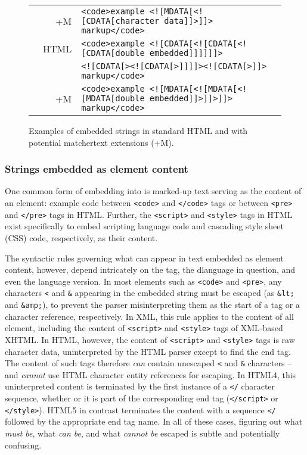 \begin{figure*}
\begin{center}
\begin{footnotesize}
\begin{tabular}{lrl}
& +M	& \verb|<code>example <![MDATA[<![CDATA[character data]]>]]> markup</code>| \\
& HTML	& \verb|<code>example <![CDATA[<![CDATA[<![CDATA[double embedded]]]]]]>| \\
&	& \verb|<![CDATA[><![CDATA[>]]]]><![CDATA[>]]> markup</code>| \\
& +M	& \verb|<code>example <![MDATA[<![MDATA[<![MDATA[double embedded]]>]]>]]> markup</code>| \\
\end{tabular}
\end{footnotesize}
\end{center}
\label{fig:ml-emb}
\caption{Examples of embedded strings in standard HTML
	and with potential matchertext extensions (+M).}
\end{figure*}


\subsubsection{Strings embedded as element content}

One common form of embedding into \ml 
is marked-up text serving as the content of an element:
\eg example code between \verb|<code>| and \verb|</code>| tags
or between \verb|<pre>| and \verb|</pre>| tags in HTML.
Further, the \verb|<script>| and \verb|<style>| tags in HTML
exist specifically to embed scripting language code
and cascading style sheet (CSS) code, respectively,
as their content.

The syntactic rules governing
what can appear in text embedded as element content,
however,
depend intricately on the tag, the d\ml language in question,
and even the language version.
In most elements such as \verb|<code>| and \verb|<pre>|,
any characters \verb|<| and \verb|&| appearing in the embedded string
must be escaped (as \verb|&lt;| and \verb|&amp;|),
to prevent the \ml parser misinterpreting them as
the start of a tag or a character reference,
respectively.
In XML, this rule applies to the content of all element,
including the content of \verb|<script>| and \verb|<style>| tags
of XML-based XHTML.
In HTML, however, the content of \verb|<script>| and \verb|<style>| tags
is raw character data,
uninterpreted by the HTML parser except to find the end tag.
The content of such tags therefore \emph{can} contain
unescaped \verb|<| and \verb|&| characters --
and \emph{cannot} use HTML character entity references for escaping.
In HTML4, this uninterpreted content is terminated
by the first instance of a \verb|</| character sequence,
whether or it is part of the corresponding end tag
(\verb|</script>| or \verb|</style>|).
HTML5 in contrast terminates the content with a sequence \verb|</|
followed by the appropriate end tag name.
In all of these cases, figuring out what \emph{must be},
what \emph{can be}, and what \emph{cannot be}
escaped is subtle and potentially confusing.

